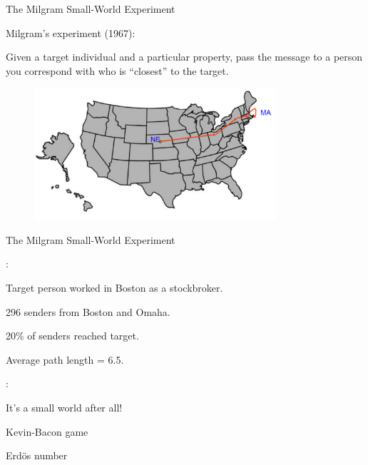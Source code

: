\begin{frame}{The Milgram Small-World Experiment}

Milgram's experiment (1967):

Given a target individual and a particular property, pass the message to a 
person you correspond with who is “closest” to the target.

\begin{figure}
\includegraphics[width=0.8\textwidth]{milgram}
\end{figure}
	
\end{frame}

\begin{frame}{The Milgram Small-World Experiment}
	
:

\BI
\item Target person worked in Boston as a stockbroker.
\item 296 senders from Boston and Omaha.
\item 20\% of senders reached target.
\item Average path length = 6.5.
\EI

\bigskip
{}:

\BI
\item It's a small world after all!
\item Kevin-Bacon game
\item Erd\"os number
\EI

\end{frame}

